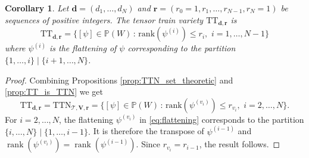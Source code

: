 \documentclass[12pt]{article}
\newtheorem{corollary}[theorem]{Corollary}
\theoremstyle{definition}
\numberwithin{theorem}{section}
\newcommand{\PP}{\mathbb{P}}
\begin{document}
\begin{corollary}\label{cor: TT flattening}
Let $\mathbf{d}=(d_1, \ldots, d_N)$ and $\mathbf{r} = (r_0=1, r_1, \ldots, r_{N-1},r_N=1)$ be sequences of positive integers. The tensor train variety $\mathrm{TT}_{\mathbf{d}, \mathbf{r}}$ is
$$ \mathrm{TT}_{\mathbf{d}, \mathbf{r}} = \{ [\psi] \in \PP(W) \, : \, \mathrm{rank}(\psi^{(i)}) \leq r_i, \,\, i=1, \ldots, N-1\}$$
where $\psi^{(i)}$ is the flattening of 
$\psi$ corresponding to the partition 
$\{1,\ldots,i\} \mid\{i+1, \ldots, N\}$.
\end{corollary}
\begin{proof}
Combining Propositions \ref{prop:TTN_set_theoretic} and  
\ref{prop:TT_is_TTN} we get
$$ \mathrm{TT}_{\mathbf{d}, \mathbf{r}} =\mathrm{TTN}_{\mathscr T,\mathbf V,\mathbf r} =  \{ [\psi] \in \PP(W) \, : \, \mathrm{rank}(\psi^{(v_i)}) \leq r_{v_i}, \,\, i=2, \ldots, N\}.$$
For $i=2,\ldots,N$, the flattening $\psi^{(v_i)}$ in \eqref{eq:flattening} corresponds to
the partition $\{i,\ldots,N\}\mid\{1,\ldots,i-1\}.$
It is therefore the transpose of $\psi^{(i-1)}$ and $\operatorname{rank}(\psi^{(v_i)})
=
\operatorname{rank}(\psi^{(i-1)}).$
Since $r_{v_i}=r_{i-1}$, the result follows.
\end{proof}
\end{document}
